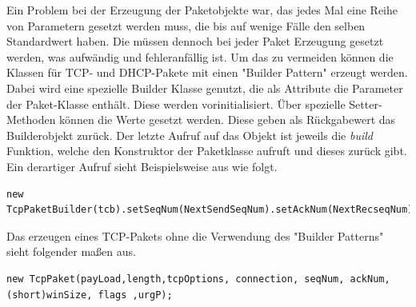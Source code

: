 Ein Problem bei der Erzeugung der Paketobjekte war, das jedes Mal eine Reihe von Parametern gesetzt werden muss, die bis auf wenige Fälle den selben Standardwert haben. Die müssen dennoch bei jeder Paket Erzeugung gesetzt werden, was aufwändig und fehleranfällig ist. Um das zu vermeiden können die Klassen für TCP- und DHCP-Pakete mit einen "{}Builder Pattern"{} erzeugt werden.  Dabei wird eine spezielle Builder Klasse genutzt, die als Attribute die Parameter der Paket-Klasse enthält. Diese werden vorinitialisiert. Über spezielle Setter-Methoden können die Werte gesetzt werden. Diese geben als Rückgabewert das Builderobjekt zurück. Der letzte Aufruf auf das Objekt ist jeweils die \textit{build} Funktion, welche den Konstruktor der Paketklasse aufruft und dieses zurück gibt. Ein derartiger Aufruf sieht Beispielsweise aus wie folgt. 
\lstset{language=Java}
\begin{lstlisting}
new TcpPaketBuilder(tcb).setSeqNum(NextSendSeqNum).setAckNum(NextRecseqNum).setAck().build()
\end{lstlisting}
Das erzeugen eines TCP-Pakets ohne die Verwendung des "{}Builder Patterns"{} sieht folgender maßen aus. 

\begin{lstlisting}
new TcpPaket(payLoad,length,tcpOptions, connection, seqNum, ackNum, (short)winSize, flags ,urgP);
\end{lstlisting}



